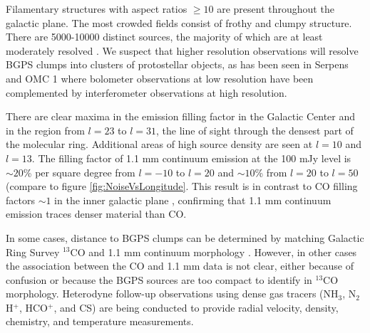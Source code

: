 \documentclass[12pt,preprint]{aastex}
\newcommand{\lon}{\ensuremath{l}}
\begin{document}


Filamentary structures with aspect ratios $\geq 10$ are present
throughout the galactic plane.  The most crowded fields consist of
frothy and clumpy structure.  There are 5000-10000 distinct sources,
the majority of which are at least moderately resolved
\citep{rosolowsky09}.  We suspect that higher resolution observations
will resolve BGPS clumps into clusters of protostellar objects, as has
been seen in Serpens \citep{enoch08,Testi1998} and OMC 1
\citep{Beuther2004,johnstone99} where bolometer observations at low
resolution have been complemented by interferometer observations at
high resolution.

There are clear maxima in the emission filling factor in the Galactic
Center and in the region from $\lon=23$ to $\lon=31$, the line of sight
through the densest part of the molecular ring.  Additional areas of
high source density are seen at $\lon=10$ and $\lon=13$.  The filling factor
of 1.1 mm continuum emission at the 100 mJy level is $\sim 20$\% per
square degree from $\lon=-10$ to $\lon=20$ and $\sim 10$\% from $\lon=20$ to
$\lon=50$ (compare to figure \ref{fig:NoiseVsLongitude}.
This result is in contrast to CO filling factors $\sim1$ in the inner galactic
plane \citep{dame01,jackson06}, confirming that 1.1 mm continuum emission traces
denser material than CO.  

In some cases, distance to BGPS clumps can be determined by matching
Galactic Ring Survey $^{13}$CO and 1.1 mm continuum morphology
\citep{IRDCdistance,jackson06}.  However, in other cases the association
between the CO and 1.1 mm data is not clear, either because of
confusion or because the BGPS sources are too compact to identify in
$^{13}$CO morphology.  Heterodyne follow-up observations using dense
gas tracers (NH$_3$, N$_2$H$^+$, HCO$^+$, and CS) are being conducted
to provide radial velocity, density, chemistry, and temperature
measurements. %
\end{document}
